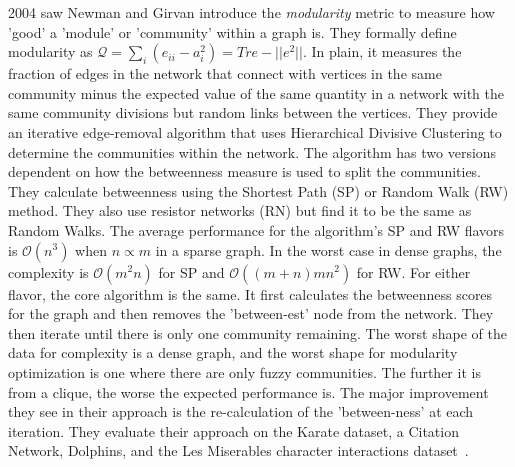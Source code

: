  \par{2004 saw Newman and Girvan introduce the \textit{modularity} metric to measure how 'good' a 'module' or 'community' within a graph is. They formally define modularity as $ \mathcal{Q} = \sum_{i} (e_{ii}-a^2_i) = Tr e-||e^2||$. In plain, it measures the fraction of edges in the network that connect with vertices in the same community minus the expected value of the same quantity in a network with the same community divisions but random links between the vertices. They provide an iterative edge-removal algorithm that uses Hierarchical Divisive Clustering to determine the communities within the network. The algorithm has two versions dependent on how the betweenness measure is used to split the communities. They calculate betweenness using the Shortest Path (SP) or Random Walk (RW) method. They also use resistor networks (RN) but find it to be the same as Random Walks. The average performance for the algorithm's SP and RW flavors is $\mathcal{O}(n^3)$ when $n \propto m$ in a sparse graph. In the worst case in dense graphs, the complexity is $\mathcal{O}(m^2n)$ for SP and $\mathcal{O}((m+n)mn^2)$ for RW. For either flavor, the core algorithm is the same. It first calculates the betweenness scores for the graph and then removes the 'between-est' node from the network. They then iterate until there is only one community remaining. The worst shape of the data for complexity is a dense graph, and the worst shape for modularity optimization is one where there are only fuzzy communities. The further it is from a clique, the worse the expected performance is. The major improvement they see in their approach is the re-calculation of the 'between-ness' at each iteration. They evaluate their approach on the Karate dataset, a Citation Network, Dolphins, and the Les Miserables character interactions dataset~\cite{Newman2004a}.}
 
